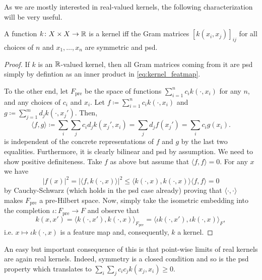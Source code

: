 As we are mostly interested in real-valued kernels, the following 
characterization will be very useful.
\begin{lemma}
    A function $k \colon X \times X \to \mathbb{R}$ is a kernel 
    iff the Gram matrices $[k(x_i,x_j)]_{ij}$ 
    for all choices of $n$ and $x_1, \dots, x_n$
    are symmetric and psd.
\end{lemma}
\begin{proof}
    If $k$ is an $\mathbb{R}$-valued kernel, then all Gram matrices
    coming from it are psd simply by defintion as an inner 
    product in \cref{eq:kernel_featmap}.

    To the other end, let $F_{\textrm{pre}}$ be the
    space of functions $\sum_{i=1}^n c_i k(\cdot,x_i)$ for 
    any $n$, and any choices of $c_i$ and $x_i$.
    Let $f \coloneqq \sum_{i=1}^n c_i k(\cdot,x_i)$ and
    $g \coloneqq \sum_{j=1}^m d_j k(\cdot,x_j')$.
    Then, 
    \begin{equation*}
        \langle f,g \rangle \coloneqq 
            \sum_i \sum_j c_i d_j k(x_j', x_i)
            = \sum_j d_j f(x_j') = \sum_i c_i g(x_i).
    \end{equation*}
    is independent of the concrete representations of $f$ 
    and $g$ by the last two equalities.
    Furthermore, it is clearly bilinear and psd by assumption.
    We need to show positive definiteness. 
    Take $f$ as above but assume that $\langle f,f \rangle = 0$.
    For any $x$ we have 
    \begin{equation} \label{eq:firstreprprop}
        |f(x)|^2 = | \langle f, k(\cdot,x) \rangle |^2
            \leq \langle k(\cdot,x),k(\cdot,x) \rangle
            \langle f,f \rangle = 0
    \end{equation}
    by Cauchy-Schwarz (which holds in the psd case already) 
    proving that $\langle \cdot, \cdot \rangle$ makes 
    $F_{\textrm{pre}}$ a pre-Hilbert space.
    Now, simply take the isometric embedding into the completion 
    $\iota \colon F_{\textrm{pre}} \to F$
    and observe that
    \begin{equation*}
        k(x,x') = 
            \langle k(\cdot,x'), k(\cdot,x) \rangle_{F_{\textrm{pre}}}
            = \langle \iota k(\cdot,x'), \iota k(\cdot,x) \rangle_F,
    \end{equation*}
    i.e. $x \mapsto \iota k(\cdot,x)$ is a feature map and, 
    consequently, $k$ a kernel.
\end{proof}

An easy but important consequence of this is that point-wise limits
of real kernels are again real kernels.
Indeed, symmetry is a closed condition and so is the psd property 
which translates to 
$\sum_i \sum_j c_i c_j k(x_j,x_i) \geq 0$.

